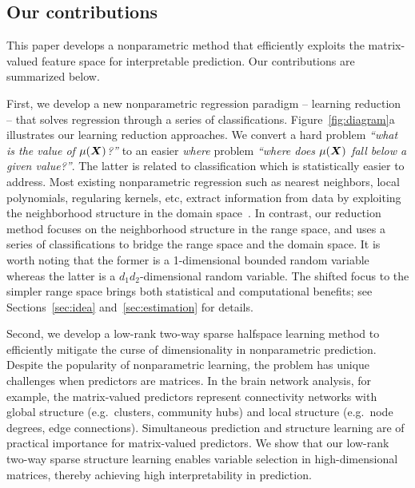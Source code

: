 \documentclass[11pt]{article}
\theoremstyle{plain}
\theoremstyle{definition}
\begin{document}
\subsection{Our contributions}
This paper develops a nonparametric method that efficiently exploits the matrix-valued feature space for interpretable prediction. Our contributions are summarized below. 

First, we develop a new nonparametric regression paradigm -- learning reduction~\citep{vapnik2013nature} -- that solves regression through a series of classifications. Figure~\ref{fig:diagram}a illustrates our learning reduction approaches. We convert a hard problem \emph{``what is the value of $\mu(\bm X)$?''} to an easier \emph{where} problem \emph{``where does $\mu(\bm X)$ fall below a given value?''}. The latter is related to classification which is statistically easier to address. Most existing nonparametric regression such as nearest neighbors, local polynomials, regularing kernels, etc, extract information from data by exploiting the neighborhood structure in the domain space~\citep{wasserman2006all}. In contrast, our reduction method focuses on the neighborhood structure in the range space, and uses a series of classifications to bridge the range space and the domain space. It is worth noting that the former is a 1-dimensional bounded random variable whereas the latter is a $d_1d_2$-dimensional random variable. The shifted focus to the simpler range space brings both statistical and computational benefits; see Sections~\ref{sec:idea} and~\ref{sec:estimation} for details. 

Second, we develop a low-rank two-way sparse halfspace learning method to efficiently mitigate the curse of dimensionality in nonparametric prediction. Despite the popularity of nonparametric learning, the problem has unique challenges when predictors are matrices. In the brain network analysis, for example, the matrix-valued predictors represent connectivity networks with global structure (e.g.\ clusters, community hubs) and local structure (e.g.\ node degrees, edge connections)\citep{relion2019network}. Simultaneous prediction and structure learning are of practical importance for matrix-valued predictors. We show that our low-rank two-way sparse structure learning enables variable selection in high-dimensional matrices, thereby achieving high interpretability in prediction. 
\end{document}
